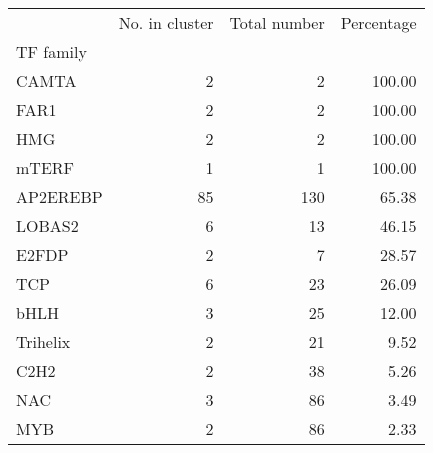 \begin{tabular}{lrrr}
\toprule
{} &  No. in cluster &  Total number &  Percentage \\
TF family &                 &               &             \\
\midrule
CAMTA     &               2 &             2 &      100.00 \\
FAR1      &               2 &             2 &      100.00 \\
HMG       &               2 &             2 &      100.00 \\
mTERF     &               1 &             1 &      100.00 \\
AP2EREBP  &              85 &           130 &       65.38 \\
LOBAS2    &               6 &            13 &       46.15 \\
E2FDP     &               2 &             7 &       28.57 \\
TCP       &               6 &            23 &       26.09 \\
bHLH      &               3 &            25 &       12.00 \\
Trihelix  &               2 &            21 &        9.52 \\
C2H2      &               2 &            38 &        5.26 \\
NAC       &               3 &            86 &        3.49 \\
MYB       &               2 &            86 &        2.33 \\
\bottomrule
\end{tabular}
